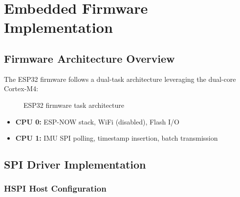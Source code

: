 
\chapter{Embedded Firmware Implementation} \label{chap:firmware}

\section{Firmware Architecture Overview}

The ESP32 firmware follows a dual-task architecture leveraging the dual-core Cortex-M4:

\begin{figure}[h]
    \centering
    \caption{ESP32 firmware task architecture}
    \label{fig:firmware_arch}
\end{figure}

\begin{itemize}
    \item \textbf{CPU 0:} ESP-NOW stack, WiFi (disabled), Flash I/O
    \item \textbf{CPU 1:} IMU SPI polling, timestamp insertion, batch transmission
\end{itemize}

\section{SPI Driver Implementation}

\subsection{HSPI Host Configuration}

